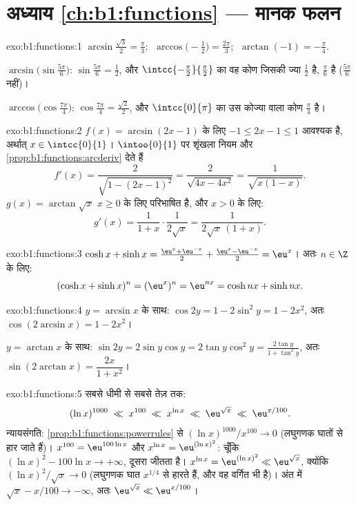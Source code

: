 \section*{अध्याय \ref{ch:b1:functions} --- मानक फलन}

\begin{solution}{exo:b1:functions:1}
$\arcsin\frac{\sqrt 3}{2} = \frac\pi3$;
$\;\arccos\bigl(-\frac12\bigr) = \frac{2\pi}{3}$;
$\;\arctan(-1) = -\frac\pi4$.

$\arcsin\bigl(\sin\frac{5\pi}{6}\bigr)$: $\sin\frac{5\pi}{6} = \frac12$, और
$\intcc{-\frac\pi2}{\frac\pi2}$ का वह कोण जिसकी ज्या $\frac12$ है,
$\frac\pi6$ है ($\frac{5\pi}{6}$ नहीं)।

$\arccos\bigl(\cos\frac{7\pi}{4}\bigr)$: $\cos\frac{7\pi}{4} = \frac{\sqrt
2}{2}$, और $\intcc{0}{\pi}$ का उस कोज्या वाला कोण $\frac\pi4$ है।
\end{solution}

\begin{solution}{exo:b1:functions:2}
$f(x) = \arcsin(2x - 1)$ के लिए $-1 \leq 2x - 1 \leq 1$ आवश्यक है, अर्थात्
$x \in \intcc{0}{1}$। $\intoo{0}{1}$ पर शृंखला नियम और
\cref{prop:b1:functions:arcderiv} देते हैं
\[
f'(x) = \frac{2}{\sqrt{1 - (2x-1)^2}} = \frac{2}{\sqrt{4x - 4x^2}}
= \frac{1}{\sqrt{x(1 - x)}} .
\]
$g(x) = \arctan\sqrt x$ $x \geq 0$ के लिए परिभाषित है, और $x > 0$ के लिए:
\[
g'(x) = \frac{1}{1 + x} \cdot \frac{1}{2\sqrt x}
= \frac{1}{2\sqrt x\,(1 + x)} .
\]
\end{solution}

\begin{solution}{exo:b1:functions:3}
$\cosh x + \sinh x = \frac{\eu^x + \eu^{-x}}{2} + \frac{\eu^x - \eu^{-x}}{2}
= \eu^x$। अतः $n \in \Z$ के लिए:
\[
(\cosh x + \sinh x)^n = (\eu^x)^n = \eu^{nx}
= \cosh nx + \sinh nx .
\]
\end{solution}

\begin{solution}{exo:b1:functions:4}
$y = \arcsin x$ के साथ: $\cos 2y = 1 - 2\sin^2 y = 1 - 2x^2$, अतः
$\cos(2\arcsin x) = 1 - 2x^2$।

$y = \arctan x$ के साथ: $\sin 2y = 2 \sin y \cos y = 2 \tan y \cos^2 y =
\frac{2\tan y}{1 + \tan^2 y}$, अतः $\sin(2\arctan x) = \dfrac{2x}{1 + x^2}$।
\end{solution}

\begin{solution}{exo:b1:functions:5}
सबसे धीमी से सबसे तेज़ तक:
\[
(\ln x)^{1000} \;\ll\; x^{100} \;\ll\; x^{\ln x} \;\ll\;
\eu^{\sqrt x} \;\ll\; \eu^{x/100} .
\]
न्यायसंगति: \cref{prop:b1:functions:powerrules} से $(\ln x)^{1000}/x^{100}
\to 0$ (लघुगणक घातों से हार जाते हैं)। $x^{100} = \eu^{100\ln x}$ और $x^{\ln
x} = \eu^{(\ln x)^2}$: चूँकि $(\ln x)^2 - 100\ln x \to +\infty$, दूसरा जीतता
है। $x^{\ln x} = \eu^{(\ln x)^2} \ll \eu^{\sqrt x}$, क्योंकि $(\ln
x)^2/\sqrt x \to 0$ (लघुगणक घात $x^{1/4}$ से हारते हैं, और वह वर्गित भी है)।
अंत में $\sqrt x - x/100 \to -\infty$, अतः $\eu^{\sqrt x} \ll \eu^{x/100}$।
\end{solution}

